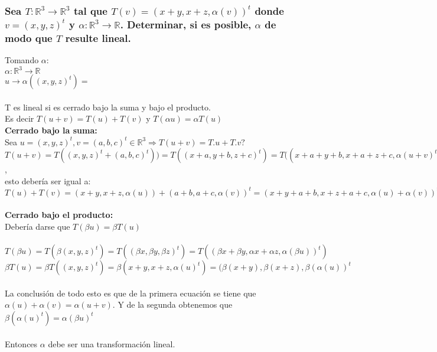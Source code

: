 \documentclass{article}
\begin{document}
\subsubsection{Sea $T: \mathbb{R}^3 \rightarrow \mathbb{R}^3$ tal que $T(v) = (x+y,x+z,\alpha(v))^t$
donde $v = (x,y,z)^t$ y $\alpha: \mathbb{R}^3 \rightarrow \mathbb{R}$. Determinar, si es posible, $\alpha$
de modo que $T$ resulte lineal.}
Tomando $\alpha$:
\\ $\alpha : \mathbb{R}^3 \rightarrow \mathbb{R}$
\\ $u \rightarrow \alpha((x,y,z)^t) =  $
\\ \\ T es lineal si es cerrado bajo la suma y bajo el producto.
\\ Es decir $T(u+v) = T(u)+T(v)$ y $T(\alpha u) = \alpha T(u)$
\\ \textbf{Cerrado bajo la suma:}
\\ Sea $u=(x,y,z)^t,v=(a,b,c)^t \in \mathbb{R}^3 \Rightarrow T(u+v) = T.u+T.v?$
\\ $T(u+v) = T((x,y,z)^t+(a,b,c)^t)) = T((x+a,y+b,z+c)^t)=T((x+a+y+b,x+a+z+c,\alpha(u+v)^t)$, \\
esto debería ser igual a:\\  $T(u)+T(v) = (x+y,x+z,\alpha(u)) + (a+b,a+c,\alpha(v))^t = 
(x+y+a+b,x+z+a+c,\alpha(u)+\alpha(v))^t$
\\ \\
\textbf{Cerrado bajo el producto:} \\
Debería darse que $T(\beta u) = \beta T(u)$ \\
\\ $T(\beta u) = T(\beta (x,y,z)^t) = T((\beta x, \beta y, \beta z)^t) = T((\beta x + \beta y,
\alpha x+ \alpha z, \alpha(\beta u))^t)$
\\ $\beta T(u) = \beta T((x,y,z)^t) = \beta (x+y,x+z,\alpha(u)^t) = (\beta(x+y), \beta(x+z),\beta(\alpha(
u))^t$
\\ \\ La conclusión de todo esto es que de la primera ecuación se tiene que $\alpha(u)+\alpha(v) = \alpha(u+v)$.
Y de la segunda obtenemos que $\beta(\alpha(u)^t) = \alpha(\beta u)^t$
\\ \\ Entonces $\alpha$ debe ser una transformación lineal.
\end{document}
